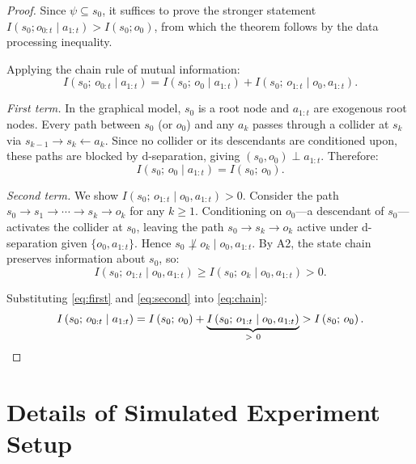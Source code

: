\documentclass{llmxive}
\begin{document}
\begin{proof}
Since $\psi \subseteq s_0$, it suffices to prove the stronger statement 
$I\left(s_0; o_{0:t} \mid a_{1:t}\right) > I\left(s_0; o_0\right)$, from which the theorem 
follows by the data processing inequality.

Applying the chain rule of mutual information:
\begin{equation}
I\left(s_0;\, o_{0:t} \mid a_{1:t}\right) = I\left(s_0;\, o_0 \mid a_{1:t}\right) + 
I\left(s_0;\, o_{1:t} \mid o_0, a_{1:t}\right).
\label{eq:chain}
\end{equation}

\textit{First term.} In the graphical model, $s_0$ is a root node and 
$a_{1:t}$ are exogenous root nodes. Every path between $s_0$ (or $o_0$) 
and any $a_k$ passes through a collider at $s_k$ via $s_{k-1} \to s_k 
\leftarrow a_k$. Since no collider or its descendants are conditioned upon, 
these paths are blocked by d-separation, giving $\left(s_0, o_0\right) \perp a_{1:t}$. 
Therefore:
\begin{equation}
I\left(s_0;\, o_0 \mid a_{1:t}\right) = I\left(s_0;\, o_0\right).
\label{eq:first}
\end{equation}

\textit{Second term.} We show $I\left(s_0;\, o_{1:t} \mid o_0, a_{1:t}\right) > 0$. 
Consider the path $s_0 \to s_1 \to \cdots \to s_k \to o_k$ for any 
$k \geq 1$. Conditioning on $o_0$—a descendant of $s_0$—activates the 
collider at $s_0$, leaving the path $s_0 \to s_k \to o_k$ active under 
d-separation given $\{o_0, a_{1:t}\}$. Hence $s_0 \not\perp o_k \mid 
o_0, a_{1:t}$. By A2, the state chain preserves information about $s_0$, 
so:
\begin{equation}
I\left(s_0;\, o_{1:t} \mid o_0, a_{1:t}\right) \geq I\left(s_0;\, o_k \mid o_0, a_{1:t}\right) 
> 0.
\label{eq:second}
\end{equation}

Substituting \eqref{eq:first} and \eqref{eq:second} into \eqref{eq:chain}:
\begin{equation}
I\left(s_0;\, o_{0:t} \mid a_{1:t}\right) = I\left(s_0;\, o_0\right) + 
\underbrace{I\left(s_0;\, o_{1:t} \mid o_0, a_{1:t}\right)}_{>\ 0} > I\left(s_0;\, o_0\right).
\qedhere
\end{equation}
\end{proof}






\section{Details of Simulated Experiment Setup}
\label{app:sim}
\end{document}

